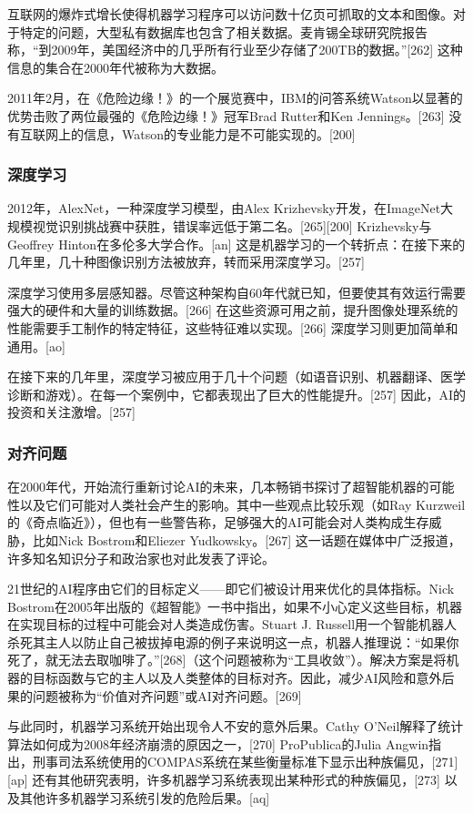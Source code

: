 互联网的爆炸式增长使得机器学习程序可以访问数十亿页可抓取的文本和图像。对于特定的问题，大型私有数据库也包含了相关数据。麦肯锡全球研究院报告称，“到2009年，美国经济中的几乎所有行业至少存储了200TB的数据。”[262] 这种信息的集合在2000年代被称为大数据。

2011年2月，在《危险边缘！》的一个展览赛中，IBM的问答系统Watson以显著的优势击败了两位最强的《危险边缘！》冠军Brad Rutter和Ken Jennings。[263] 没有互联网上的信息，Watson的专业能力是不可能实现的。[200]
\subsubsection{深度学习}   
2012年，AlexNet，一种深度学习模型，由Alex Krizhevsky开发，在ImageNet大规模视觉识别挑战赛中获胜，错误率远低于第二名。[265][200] Krizhevsky与Geoffrey Hinton在多伦多大学合作。[an] 这是机器学习的一个转折点：在接下来的几年里，几十种图像识别方法被放弃，转而采用深度学习。[257]

深度学习使用多层感知器。尽管这种架构自60年代就已知，但要使其有效运行需要强大的硬件和大量的训练数据。[266] 在这些资源可用之前，提升图像处理系统的性能需要手工制作的特定特征，这些特征难以实现。[266] 深度学习则更加简单和通用。[ao]

在接下来的几年里，深度学习被应用于几十个问题（如语音识别、机器翻译、医学诊断和游戏）。在每一个案例中，它都表现出了巨大的性能提升。[257] 因此，AI的投资和关注激增。[257]
\subsubsection{对齐问题}  
在2000年代，开始流行重新讨论AI的未来，几本畅销书探讨了超智能机器的可能性以及它们可能对人类社会产生的影响。其中一些观点比较乐观（如Ray Kurzweil的《奇点临近》），但也有一些警告称，足够强大的AI可能会对人类构成生存威胁，比如Nick Bostrom和Eliezer Yudkowsky。[267] 这一话题在媒体中广泛报道，许多知名知识分子和政治家也对此发表了评论。

21世纪的AI程序由它们的目标定义——即它们被设计用来优化的具体指标。Nick Bostrom在2005年出版的《超智能》一书中指出，如果不小心定义这些目标，机器在实现目标的过程中可能会对人类造成伤害。Stuart J. Russell用一个智能机器人杀死其主人以防止自己被拔掉电源的例子来说明这一点，机器人推理说：“如果你死了，就无法去取咖啡了。”[268]（这个问题被称为“工具收敛”）。解决方案是将机器的目标函数与它的主人以及人类整体的目标对齐。因此，减少AI风险和意外后果的问题被称为“价值对齐问题”或AI对齐问题。[269]

与此同时，机器学习系统开始出现令人不安的意外后果。Cathy O'Neil解释了统计算法如何成为2008年经济崩溃的原因之一，[270] ProPublica的Julia Angwin指出，刑事司法系统使用的COMPAS系统在某些衡量标准下显示出种族偏见，[271][ap] 还有其他研究表明，许多机器学习系统表现出某种形式的种族偏见，[273] 以及其他许多机器学习系统引发的危险后果。[aq]

